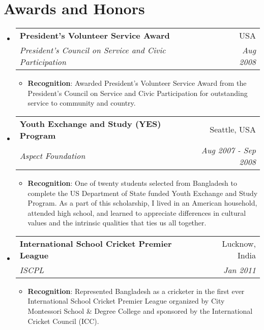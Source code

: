 \documentclass[letterpaper,11pt]{article}
\makeatletter
\newcommand{\resumeItem}[2]{
  \item\small{
    \textbf{#1}{: #2 \vspace{-2pt}}
  }
}
\newcommand{\resumeSubheading}[4]{
  \vspace{-1pt}\item
    \begin{tabular*}{0.97\textwidth}[t]{l@{\extracolsep{\fill}}r}
      \textbf{#1} & #2 \\
      \textit{\small#3} & \textit{\small #4} \\
    \end{tabular*}\vspace{-5pt}
}
\newcommand{\resumeSubHeadingListStart}{\begin{itemize}[leftmargin=*]}
\newcommand{\resumeSubHeadingListEnd}{\end{itemize}}
\newcommand{\resumeItemListStart}{\begin{itemize}}
\newcommand{\resumeItemListEnd}{\end{itemize}\vspace{-5pt}}
\makeatother
\begin{document}
\section{Awards and Honors}
  \resumeSubHeadingListStart
  \resumeSubheading
      {President's Volunteer Service Award}{USA}
      {President's Council on Service and Civic Participation}{Aug 2008}
      \resumeItemListStart
      	\resumeItem{Recognition}{Awarded President's Volunteer Service Award from the President's Council on Service and Civic Participation for outstanding service to community and country.}
      \resumeItemListEnd 
    \resumeSubheading
      {Youth Exchange and Study (YES) Program}{Seattle, USA}
      {Aspect Foundation}{Aug 2007 - Sep 2008}
      \resumeItemListStart
      	\resumeItem{Recognition}{One of twenty students selected from Bangladesh to complete the US Department of State funded Youth Exchange and Study Program. As a part of this scholarship, I lived in an American household, attended high school, and learned to appreciate differences in cultural values and the intrinsic qualities that ties us all together.}
      \resumeItemListEnd 
           \resumeSubheading
      {International School Cricket Premier League}{Lucknow, India}
      {ISCPL}{Jan 2011 }
      \resumeItemListStart
      	\resumeItem{Recognition}{Represented Bangladesh as a cricketer in the first ever International School Cricket Premier League organized by City Montessori School \& Degree College and sponsored by the International Cricket Council (ICC).}
      \resumeItemListEnd 
  \resumeSubHeadingListEnd


\end{document}
